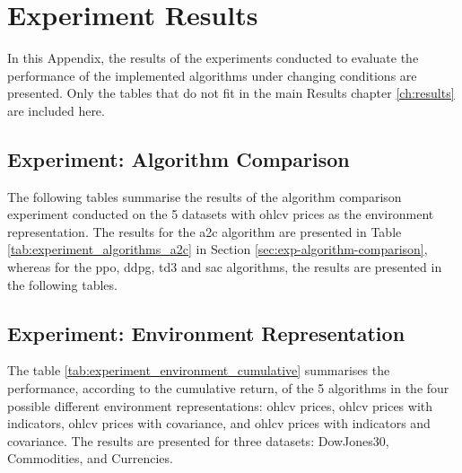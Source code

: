 \chapter{Experiment Results}

In this Appendix, the results of the experiments conducted to evaluate the performance of the implemented algorithms under changing conditions are presented. Only the tables that do not fit in the main Results chapter \ref{ch:results} are included here.

\section{Experiment: Algorithm Comparison} \label{app:experiment_algorithms_comparison}

The following tables summarise the results of the algorithm comparison experiment conducted on the 5 datasets with \acrshort{ohlcv} prices as the environment representation. The results for the \acrshort{a2c} algorithm are presented in Table \ref{tab:experiment_algorithms_a2c} in Section \ref{sec:exp-algorithm-comparison}, whereas for the \acrshort{ppo}, \acrshort{ddpg}, \acrshort{td3} and \acrshort{sac} algorithms, the results are presented in the following tables. 









\section{Experiment: Environment Representation} \label{app:experiment_environment_representation}

The table \ref{tab:experiment_environment_cumulative} summarises the performance, according to the cumulative return, of the 5 algorithms in the four possible different environment representations: \acrshort{ohlcv} prices, \acrshort{ohlcv} prices with indicators, \acrshort{ohlcv} prices with covariance, and \acrshort{ohlcv} prices with indicators and covariance. The results are presented for three datasets: DowJones30, Commodities, and Currencies. 


